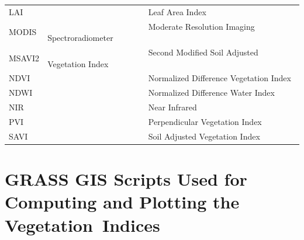 \documentclass[jmse,article,accept,pdftex,moreauthors]{Definitions/mdpi}
\begin{document}
{\noindent 
\begin{tabular}{@{}ll}
LAI & ~~~~~~~~~~~ ~~~~~~~~~~~~~Leaf Area Index \\
MODIS & ~~~~~~~~~~~ ~~~~~~~~~~~~~Moderate Resolution Imaging Spectroradiometer \\
MSAVI2 & ~~~~~~~~~~~ ~~~~~~~~~~~~~Second Modified Soil Adjusted Vegetation Index \\
NDVI & ~~~~~~~~~~~ ~~~~~~~~~~~~~Normalized Difference Vegetation Index \\
NDWI & ~~~~~~~~~~~ ~~~~~~~~~~~~~Normalized Difference Water Index \\
NIR & ~~~~~~~~~~~ ~~~~~~~~~~~~~Near Infrared \\
PVI & ~~~~~~~~~~~ ~~~~~~~~~~~~~Perpendicular Vegetation Index \\
SAVI & ~~~~~~~~~~~ ~~~~~~~~~~~~~Soil Adjusted Vegetation Index \\ 
\end{tabular}
}

\appendixstart
\appendix

\section[\appendixname~\thesection]{GRASS GIS Scripts Used for Computing and Plotting the Vegetation~Indices}
\end{document}
